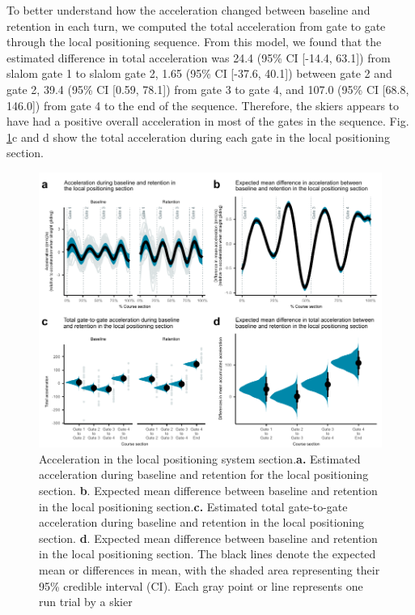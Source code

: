 \documentclass{article}
\begin{document}
To better understand how the acceleration changed between baseline and retention in each turn, we computed the total acceleration from gate to gate through the local positioning sequence. From this model, we found that the estimated difference in total acceleration was 24.4 (95\% CI [-14.4, 63.1]) from slalom gate 1 to slalom gate 2, 1.65 (95\% CI [-37.6, 40.1]) between gate 2 and gate 2, 39.4 (95\% CI [0.59, 78.1]) from gate 3 to gate 4, and 107.0 (95\% CI [68.8, 146.0]) from gate 4 to the end of the sequence. Therefore, the skiers appears to have had a positive overall acceleration in most of the gates in the sequence. Fig. \ref{fig: acc}c and d show the total acceleration during each gate in the local positioning section.

\begin{figure}[H]
\centering
\includegraphics{figurer/figure_acc_2.pdf}
\caption{Acceleration in the local positioning system section.\textbf{a.} Estimated acceleration during baseline and retention for the local positioning section. \textbf{b}. Expected mean difference between baseline and retention in the local positioning section.\textbf{c.} Estimated total gate-to-gate acceleration during baseline and retention in the local positioning section. \textbf{d}. Expected mean difference between baseline and retention in the local positioning section. The black lines denote the expected mean or differences in mean, with the shaded area representing their 95\% credible interval (CI). Each gray point or line represents one run trial by a skier}\label{fig: acc}
\end{figure}
\end{document}
